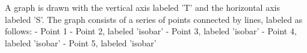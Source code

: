 A graph is drawn with the vertical axis labeled 'T' and the horizontal axis labeled 'S'. The graph consists of a series of points connected by lines, labeled as follows:
- Point 1
- Point 2, labeled 'isobar'
- Point 3, labeled 'isobar'
- Point 4, labeled 'isobar'
- Point 5, labeled 'isobar'